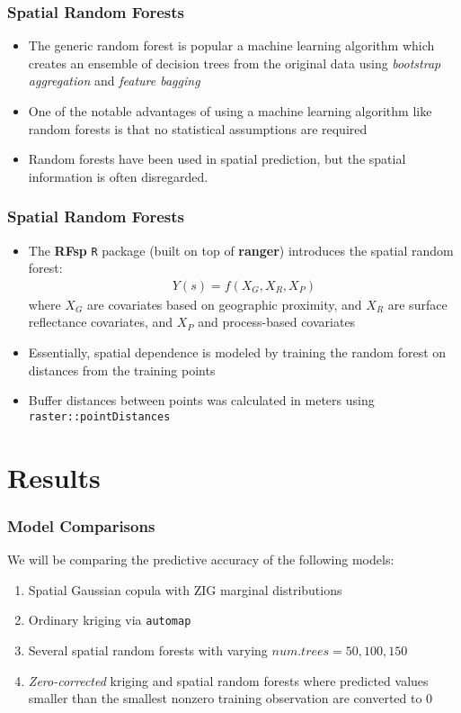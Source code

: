 \documentclass{beamer}
\begin{document}
\begin{frame}
	\frametitle{Spatial Random Forests}
	\begin{itemize}
		\item The generic random forest is popular a machine learning algorithm which creates an ensemble of decision trees from the original data using \textit{bootstrap aggregation} and \textit{feature bagging}
		\item One of the notable advantages of using a machine learning algorithm like random forests is that no statistical assumptions are required
		\item Random forests have been used in spatial prediction, but the spatial information is often disregarded\cite{hengl18}.
	\end{itemize}
\end{frame}

\begin{frame}
	\frametitle{Spatial Random Forests}
	\begin{itemize}
		\item The \textbf{RFsp} \texttt{R} package (built on top of \textbf{ranger}) introduces the spatial random forest:
		\begin{align*}
		Y(s) = f(X_G, X_R, X_P)
		\end{align*}
		where $X_G$ are covariates based on geographic proximity, and $X_R$ are surface reflectance covariates, and $X_P$ and process-based covariates
		\item Essentially, spatial dependence is modeled by training the random forest on distances from the training points
		\item Buffer distances between points was calculated in meters using \texttt{raster::pointDistances}
	\end{itemize}
\end{frame}

\section{Results}
\begin{frame}
	\frametitle{Model Comparisons}
	We will be comparing the predictive accuracy of the following models:
	\begin{enumerate}
		\item Spatial Gaussian copula with ZIG marginal distributions
		\item Ordinary kriging via \texttt{automap}
		\item Several spatial random forests with varying $num.trees = 50, 100, 150$
		\item \textit{Zero-corrected} kriging and spatial random forests where predicted values smaller than the smallest nonzero training observation are converted to 0
	\end{enumerate}
\end{frame}
\end{document}
